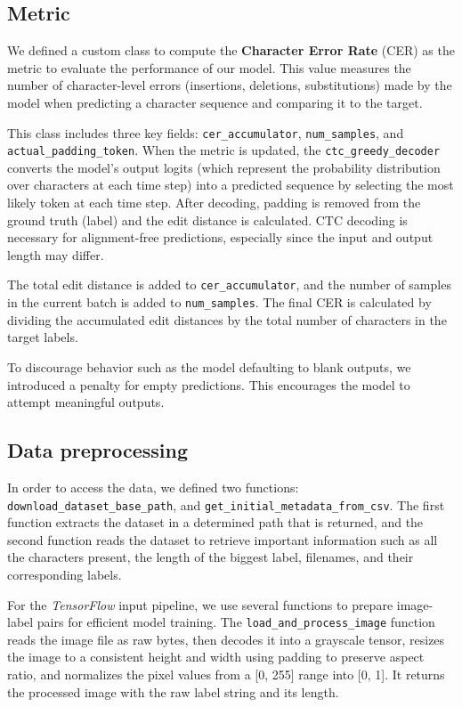 \documentclass[11pt,letterpaper]{article}
\begin{document}
	\subsection{Metric} \label{subsec:metric}
	We defined a custom class to compute the \textbf{Character Error Rate} (CER) as the metric to evaluate the performance of our model. This value measures the number of character-level errors (insertions, deletions, substitutions) made by the model when predicting a character sequence and comparing it to the target.
	
	This class includes three key fields: \texttt{cer\_accumulator}, \texttt{num\_samples}, and \texttt{actual\_padding\_token}. When the metric is updated, the \texttt{ctc\_greedy\_decoder} converts the model's output logits (which represent the probability distribution over characters at each time step) into a predicted sequence by selecting the most likely token at each time step. After decoding, padding is removed from the ground truth (label) and the edit distance is calculated. CTC decoding is necessary for alignment-free predictions, especially since the input and output length may differ.
	
	The total edit distance is added to \texttt{cer\_accumulator}, and the number of samples in the current batch is added to \texttt{num\_samples}. The final CER is calculated by dividing the accumulated edit distances by the total number of characters in the target labels.
	
	To discourage behavior such as the model defaulting to blank outputs, we introduced a penalty for empty predictions. This encourages the model to attempt meaningful outputs.
	
	\subsection{Data preprocessing}
	In order to access the data, we defined two functions: \texttt{download\_dataset\_base\_path}, and \texttt{get\_initial\-\_metadata\_from\_csv}. The first function extracts the dataset in a determined path that is returned, and the second function reads the dataset to retrieve important information such as all the characters present, the length of the biggest label, filenames, and their corresponding labels.
	
	For the \textit{TensorFlow} input pipeline, we use several functions to prepare image-label pairs for efficient model training. The \texttt{load\_and\_process\_image} function reads the image file as raw bytes, then decodes it into a grayscale tensor, resizes the image to a consistent height and width using padding to preserve aspect ratio, and normalizes the pixel values from a [0, 255] range into [0, 1]. It returns the processed image with the raw label string and its length. 
	
\end{document}
